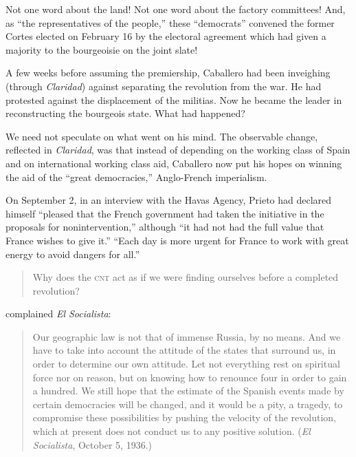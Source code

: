 Not one word about the land! Not one word about the factory committees! And, as ``the representatives of the people,'' these ``democrats'' convened the former Cortes elected on February 16 by the electoral agreement which had given a majority to the bourgeoisie on the joint slate!

A few weeks before assuming the premiership, Caballero had been inveighing (through \emph{Claridad}) against separating the revolution from the war. He had protested against the displacement of the militias. Now he became the leader in reconstructing the bourgeois state. What had happened?

We need not speculate on what went on his mind. The observable change, reflected in \emph{Claridad}, was that instead of depending on the working class of Spain and on international working class aid, Caballero now put his hopes on winning the aid of the ``great democracies,'' Anglo-French imperialism.

On September 2, in an interview with the Havas Agency, Prieto had declared himself ``pleased that the French government had taken the initiative in the proposals for nonintervention,'' although ``it had not had the full value that France wishes to give it.''
``Each day is more urgent for France to work with great energy to avoid dangers for all.''

\begin{quotation}
  Why does the \textsc{cnt} act as if we were finding ourselves before a completed revolution?
\end{quotation}
complained \emph{El Socialista}:

\begin{quotation}
  Our geographic law is not that of immense Russia, by no means. And we have to take into account the attitude of the states that surround us, in order to determine our own attitude. Let not everything rest on spiritual force nor on reason, but on knowing how to renounce four in order to gain a hundred. We still hope that the estimate of the Spanish events made by certain democracies will be changed, and it would be a pity, a tragedy, to compromise these possibilities by pushing the velocity of the revolution, which at present does not conduct us to any positive solution. (\emph{El Socialista}, October 5, 1936.)
\end{quotation}

